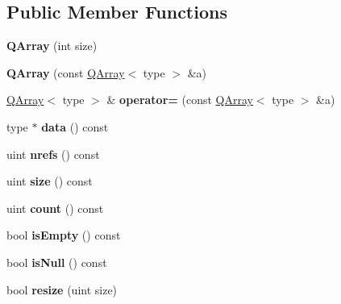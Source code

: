 \subsection*{Public Member Functions}
\begin{DoxyCompactItemize}
\item 
\mbox{\label{class_q_array_a034f799d9c3453d8c7e43c499d75a27a}} 
{\bfseries Q\+Array} (int size)
\item 
\mbox{\label{class_q_array_af35399770b255d6736af5abbcc746a86}} 
{\bfseries Q\+Array} (const \mbox{\hyperlink{class_q_array}{Q\+Array}}$<$ type $>$ \&a)
\item 
\mbox{\label{class_q_array_a72ba6a2725a6109e364658414c183595}} 
\mbox{\hyperlink{class_q_array}{Q\+Array}}$<$ type $>$ \& {\bfseries operator=} (const \mbox{\hyperlink{class_q_array}{Q\+Array}}$<$ type $>$ \&a)
\item 
\mbox{\label{class_q_array_acce87486d37d5bef7c28269b2a7dea8b}} 
type $\ast$ {\bfseries data} () const
\item 
\mbox{\label{class_q_array_a255c502db2feef28b3496c4118312963}} 
uint {\bfseries nrefs} () const
\item 
\mbox{\label{class_q_array_ae833f813b8112ccf35302ed14e434a7e}} 
uint {\bfseries size} () const
\item 
\mbox{\label{class_q_array_aab5bc9f5e4cc8b634c78d7ae60004579}} 
uint {\bfseries count} () const
\item 
\mbox{\label{class_q_array_aa8b1a6860323f9fe988dc902586cdf14}} 
bool {\bfseries is\+Empty} () const
\item 
\mbox{\label{class_q_array_a0fb358680cc16b8345cecfe7dba52550}} 
bool {\bfseries is\+Null} () const
\item 
\mbox{\label{class_q_array_a9a2194b00734a01338194cfe5abd6736}} 
bool {\bfseries resize} (uint size)
\item 
\mbox{\label{class_q_array_ab628b764c186ec5ae01cdc47d909adbb}} 

\end{DoxyCompactItemize}
